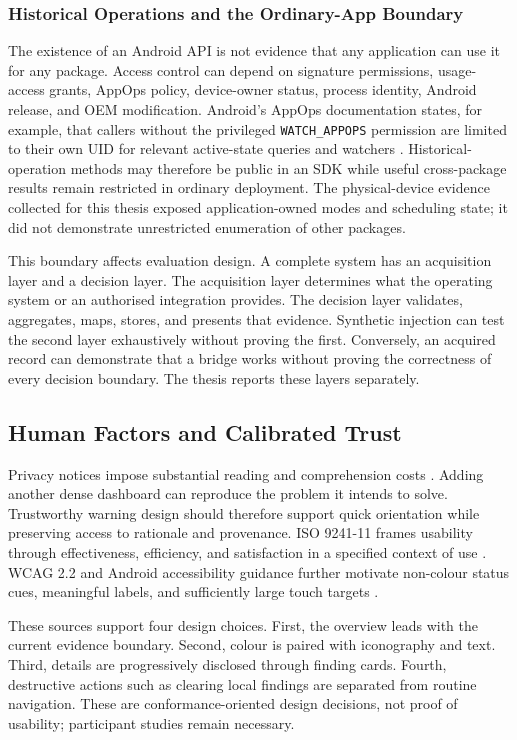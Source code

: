 \subsubsection{Historical Operations and the Ordinary-App Boundary}

The existence of an Android API is not evidence that any application can use it for any package. Access control can depend on signature permissions, usage-access grants, AppOps policy, device-owner status, process identity, Android release, and OEM modification. Android's AppOps documentation states, for example, that callers without the privileged \texttt{WATCH\_APPOPS} permission are limited to their own UID for relevant active-state queries and watchers \cite{androidappops2026}. Historical-operation methods may therefore be public in an SDK while useful cross-package results remain restricted in ordinary deployment. The physical-device evidence collected for this thesis exposed application-owned modes and scheduling state; it did not demonstrate unrestricted enumeration of other packages.

This boundary affects evaluation design. A complete system has an acquisition layer and a decision layer. The acquisition layer determines what the operating system or an authorised integration provides. The decision layer validates, aggregates, maps, stores, and presents that evidence. Synthetic injection can test the second layer exhaustively without proving the first. Conversely, an acquired record can demonstrate that a bridge works without proving the correctness of every decision boundary. The thesis reports these layers separately.

\subsection{Human Factors and Calibrated Trust}

Privacy notices impose substantial reading and comprehension costs \cite{12,13}. Adding another dense dashboard can reproduce the problem it intends to solve. Trustworthy warning design should therefore support quick orientation while preserving access to rationale and provenance. ISO 9241-11 frames usability through effectiveness, efficiency, and satisfaction in a specified context of use \cite{iso924111}. WCAG 2.2 and Android accessibility guidance further motivate non-colour status cues, meaningful labels, and sufficiently large touch targets \cite{wcag22,androidaccess}.

These sources support four design choices. First, the overview leads with the current evidence boundary. Second, colour is paired with iconography and text. Third, details are progressively disclosed through finding cards. Fourth, destructive actions such as clearing local findings are separated from routine navigation. These are conformance-oriented design decisions, not proof of usability; participant studies remain necessary.

